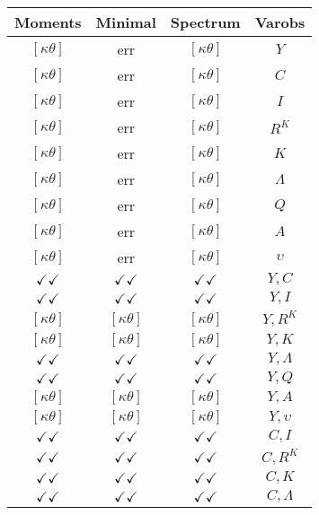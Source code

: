 \documentclass[a4paper,10pt]{article}
\begin{document}
\centering
\begin{longtable}{|c|c|c|c|}
\hline
Moments & Minimal & Spectrum & Varobs \\
\hline
$[\kappa \theta ]$ & err & $[\kappa \theta ]$ & ${Y}$ \\
\hline
$[\kappa \theta ]$ & err & $[\kappa \theta ]$ & ${C}$ \\
\hline
$[\kappa \theta ]$ & err & $[\kappa \theta ]$ & ${I}$ \\
\hline
$[\kappa \theta ]$ & err & $[\kappa \theta ]$ & ${R^{K}}$ \\
\hline
$[\kappa \theta ]$ & err & $[\kappa \theta ]$ & ${K}$ \\
\hline
$[\kappa \theta ]$ & err & $[\kappa \theta ]$ & ${\Lambda}$ \\
\hline
$[\kappa \theta ]$ & err & $[\kappa \theta ]$ & ${Q}$ \\
\hline
$[\kappa \theta ]$ & err & $[\kappa \theta ]$ & ${A}$ \\
\hline
$[\kappa \theta ]$ & err & $[\kappa \theta ]$ & ${\upsilon}$ \\
\hline
$\checkmark\checkmark$ & $\checkmark\checkmark$ & $\checkmark\checkmark$ & ${Y},{C}$ \\
\hline
$\checkmark\checkmark$ & $\checkmark\checkmark$ & $\checkmark\checkmark$ & ${Y},{I}$ \\
\hline
$[\kappa \theta ]$ & $[\kappa \theta ]$ & $[\kappa \theta ]$ & ${Y},{R^{K}}$ \\
\hline
$[\kappa \theta ]$ & $[\kappa \theta ]$ & $[\kappa \theta ]$ & ${Y},{K}$ \\
\hline
$\checkmark\checkmark$ & $\checkmark\checkmark$ & $\checkmark\checkmark$ & ${Y},{\Lambda}$ \\
\hline
$\checkmark\checkmark$ & $\checkmark\checkmark$ & $\checkmark\checkmark$ & ${Y},{Q}$ \\
\hline
$[\kappa \theta ]$ & $[\kappa \theta ]$ & $[\kappa \theta ]$ & ${Y},{A}$ \\
\hline
$[\kappa \theta ]$ & $[\kappa \theta ]$ & $[\kappa \theta ]$ & ${Y},{\upsilon}$ \\
\hline
$\checkmark\checkmark$ & $\checkmark\checkmark$ & $\checkmark\checkmark$ & ${C},{I}$ \\
\hline
$\checkmark\checkmark$ & $\checkmark\checkmark$ & $\checkmark\checkmark$ & ${C},{R^{K}}$ \\
\hline
$\checkmark\checkmark$ & $\checkmark\checkmark$ & $\checkmark\checkmark$ & ${C},{K}$ \\
\hline
$\checkmark\checkmark$ & $\checkmark\checkmark$ & $\checkmark\checkmark$ & ${C},{\Lambda}$ \\

\end{longtable}
\end{document}
